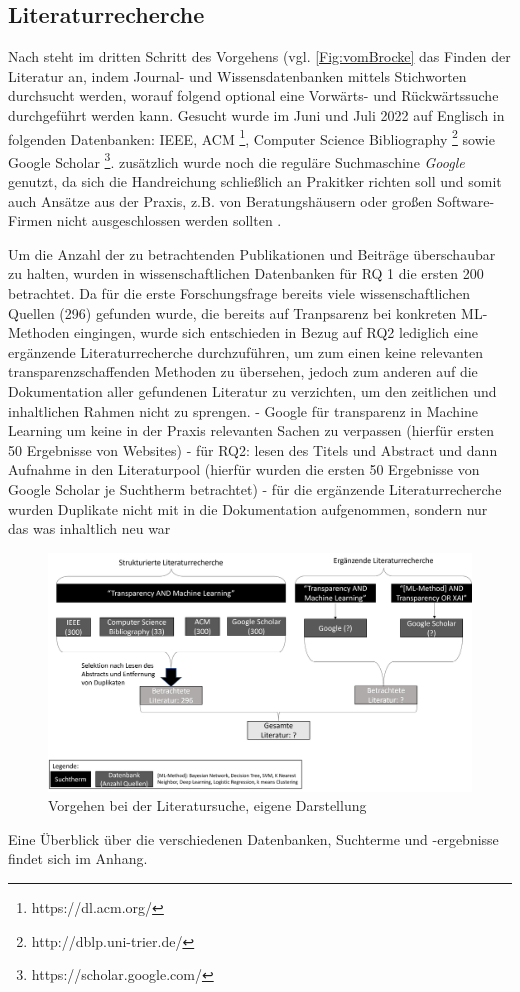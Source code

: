 \subsection{Literaturrecherche}
Nach \cite{vom_Brooke_2009} steht im dritten Schritt des Vorgehens (vgl. \ref{Fig:vomBrocke} das Finden der Literatur an, indem Journal- und Wissensdatenbanken mittels Stichworten durchsucht werden, worauf folgend optional eine Vorwärts- und Rückwärtssuche durchgeführt werden kann.
Gesucht wurde im Juni und Juli 2022 auf Englisch in folgenden Datenbanken: IEEE, ACM \footnote{https://dl.acm.org/}, Computer Science Bibliography \footnote{http://dblp.uni-trier.de/} sowie Google Scholar \footnote{https://scholar.google.com/}. zusätzlich wurde noch die reguläre Suchmaschine \textit{Google} genutzt, da sich die Handreichung schließlich an Prakitker richten soll und somit auch Ansätze aus der Praxis, z.B. von Beratungshäusern oder großen Software-Firmen nicht ausgeschlossen werden sollten .

Um die Anzahl der zu betrachtenden Publikationen und Beiträge überschaubar zu halten, wurden in wissenschaftlichen Datenbanken für RQ 1 die ersten 200 betrachtet. Da für die erste Forschungsfrage bereits viele wissenschaftlichen Quellen (296) gefunden wurde, die bereits auf Tranpsarenz bei konkreten ML-Methoden eingingen, wurde sich entschieden in Bezug auf RQ2 lediglich eine ergänzende Literaturrecherche durchzuführen, um zum einen keine relevanten transparenzschaffenden Methoden zu übersehen, jedoch zum anderen auf die Dokumentation aller gefundenen Literatur zu verzichten, um den zeitlichen und inhaltlichen Rahmen nicht zu sprengen.
- Google für transparenz in Machine Learning um keine in der Praxis relevanten Sachen zu verpassen (hierfür ersten 50 Ergebnisse von Websites)
- für RQ2: lesen des Titels und Abstract und dann Aufnahme in den Literaturpool (hierfür wurden die ersten 50 Ergebnisse von Google Scholar je Suchtherm  betrachtet)
- für die ergänzende Literaturrecherche wurden Duplikate nicht mit in die Dokumentation aufgenommen, sondern nur das was inhaltlich neu war


\begin{figure}
    \centering
    \includegraphics[scale=0.45]{pic/MA-Bilder/Literaturrecherche.png}
    \caption{Vorgehen bei der Literatursuche, eigene Darstellung}
    \label{Fig:Literatursuche}
\end{figure}

Eine Überblick über die verschiedenen Datenbanken, Suchterme und -ergebnisse findet sich im Anhang.